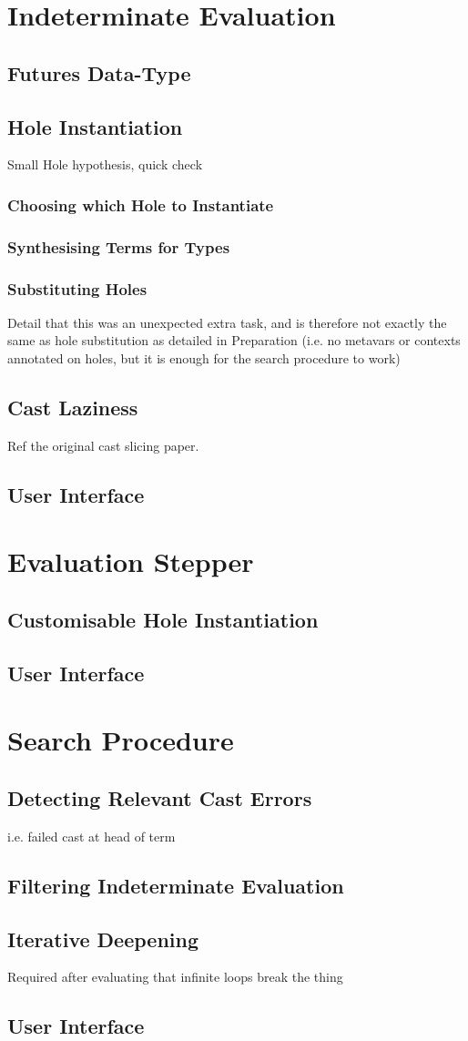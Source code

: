 \section{Indeterminate Evaluation}
\subsection{Futures Data-Type}
\subsection{Hole Instantiation}
Small Hole hypothesis, quick check
\subsubsection{Choosing which Hole to Instantiate}
\subsubsection{Synthesising Terms for Types}
\subsubsection{Substituting Holes}
Detail that this was an unexpected extra task, and is therefore not exactly the same as hole substitution as detailed in Preparation (i.e. no metavars or contexts annotated on holes, but it is enough for the search procedure to work)
\subsection{Cast Laziness}
Ref the original cast slicing paper.
\subsection{User Interface}

\section{Evaluation Stepper}
\subsection{Customisable Hole Instantiation}
\subsection{User Interface}


\section{Search Procedure}
\subsection{Detecting Relevant Cast Errors}
i.e. failed cast at head of term
\subsection{Filtering Indeterminate Evaluation}

\subsection{Iterative Deepening}
Required after evaluating that infinite loops break the thing
\subsection{User Interface}



